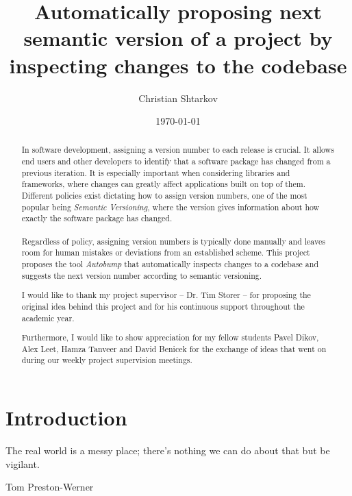 \documentclass{l4proj}
\begin{document}
\title{Automatically proposing next semantic version of a project by \\
inspecting changes to the codebase}
\author{Christian Shtarkov}
\date{\today}
\maketitle

\begin{abstract}
In software development, assigning a version number
to each release is crucial. It allows end users and other developers
to identify that a software package has changed from a previous
iteration. It is especially important when considering libraries and
frameworks, where changes can greatly affect applications built on top
of them. \\ Different policies exist dictating how to assign version
numbers, one of the most popular being \textit{Semantic
Versioning}, where the version gives
information about how exactly the software package has changed.
\\\\
Regardless of
policy, assigning version numbers is typically done manually and
leaves room for human mistakes or deviations from an established
scheme. This project proposes the tool \textit{Autobump} that automatically
inspects changes to a codebase and suggests the next version number
according to semantic versioning.
\end{abstract}

\renewcommand{\abstractname}{Acknowledgements}
\begin{abstract}
I would like to thank my project supervisor -- Dr. Tim Storer -- for
proposing the original idea behind this project and for his continuous
support throughout the academic year.

\noindent Furthermore, I would like to show appreciation for my fellow students
Pavel Dikov, Alex Leet, Hamza Tanveer and David Benicek for the
exchange of ideas that went on during our weekly project supervision
meetings.
\end{abstract}

\educationalconsent

\tableofcontents

\chapter{Introduction}

\epigraph{The real world is a messy place; there’s nothing we can do
about that but be vigilant.}{Tom Preston-Werner}
\end{document}
